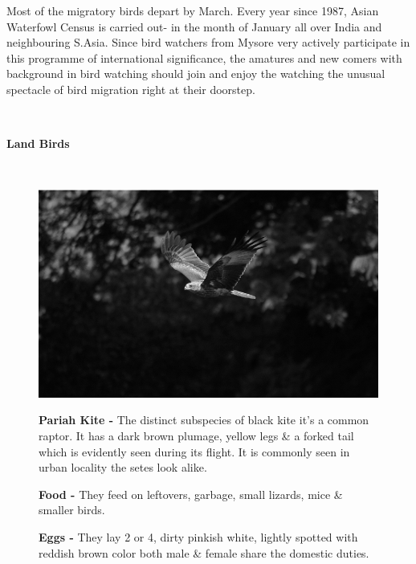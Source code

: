 Most of the migratory birds depart by March. Every year
since 1987, Asian Waterfowl Census is carried out- in the 
month of January all over India and neighbouring S.Asia. 
Since bird watchers from Mysore very actively participate in 
this programme of international significance, the amatures 
and new comers with background in bird watching should join 
and enjoy the watching the unusual spectacle of bird 
migration right at their doorstep. 


\newpage

~\phantom{a}
\thispagestyle{empty}
\vfill


\begin{center}
{\huge\sf\bfseries Land Birds}
\end{center}


\vfill\eject

~\phantom{a}
\vfill

\begin{figure}[H]
\begin{center}
\includegraphics{figure/Land_birds/01_pariah_kite/pariah-kite.eps}
\end{center}
\medskip
\noindent
{\bf Pariah Kite -} The distinct subspecies of black kite it's a common raptor. It has a dark brown plumage, yellow legs \& a forked tail which is evidently seen during its flight. It is commonly seen in urban locality the setes look alike.

\medskip  

{\bf Food -} They feed on leftovers, garbage, small lizards, mice \& smaller birds. 

{\bf Eggs -} They lay 2 or 4, dirty pinkish white, lightly spotted with reddish brown color both male \& female share the domestic duties.
\end{figure}

